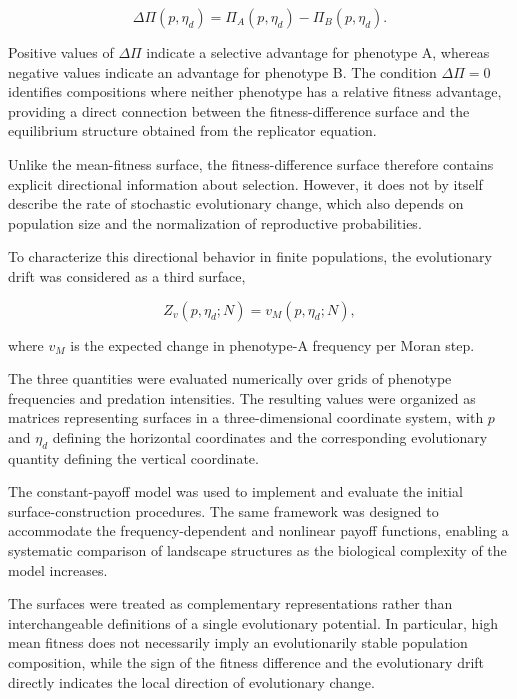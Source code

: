 \begin{equation}
\Delta\Pi(p,\eta_d)
=
\Pi_A(p,\eta_d)-\Pi_B(p,\eta_d).
\label{eq:method_fitness_difference}
\end{equation}

Positive values of \(\Delta\Pi\) indicate a selective advantage for phenotype A, whereas negative values indicate an advantage for phenotype B. The condition \(\Delta\Pi=0\) identifies compositions where neither phenotype has a relative fitness advantage, providing a direct connection between the fitness-difference surface and the equilibrium structure obtained from the replicator equation.

Unlike the mean-fitness surface, the fitness-difference surface therefore contains explicit directional information about selection. However, it does not by itself describe the rate of stochastic evolutionary change, which also depends on population size and the normalization of reproductive probabilities.

To characterize this directional behavior in finite populations, the evolutionary drift was considered as a third surface,

\begin{equation}
Z_v(p,\eta_d;N)
=
v_M(p,\eta_d;N),
\label{eq:method_drift_surface}
\end{equation}

where \(v_M\) is the expected change in phenotype-A frequency per Moran step.

The three quantities were evaluated numerically over grids of phenotype frequencies and predation intensities. The resulting values were organized as matrices representing surfaces in a three-dimensional coordinate system, with \(p\) and \(\eta_d\) defining the horizontal coordinates and the corresponding evolutionary quantity defining the vertical coordinate.

The constant-payoff model was used to implement and evaluate the initial surface-construction procedures. The same framework was designed to accommodate the frequency-dependent and nonlinear payoff functions, enabling a systematic comparison of landscape structures as the biological complexity of the model increases.

The surfaces were treated as complementary representations rather than interchangeable definitions of a single evolutionary potential. In particular, high mean fitness does not necessarily imply an evolutionarily stable population composition, while the sign of the fitness difference and the evolutionary drift directly indicates the local direction of evolutionary change.

